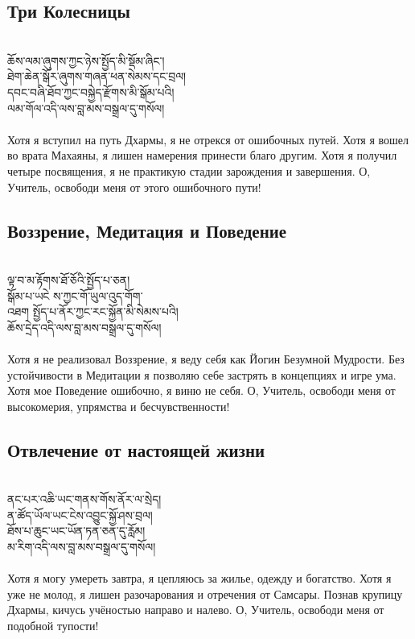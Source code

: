 \subsection*{Три Колесницы}
\\
\ti
ཆོས་ལམ་ཞུགས་ཀྱང་ཉེས་སྤྱོད་མི་སྡོམ་ཞིང་།\\
ཐེག་ཆེན་སྒོར་ཞུགས་གཞན་ཕན་སེམས་དང་བྲལ།\\
དབང་བཞི་ཐོབ་ཀྱང་བསྐྱེད་རྫོགས་མི་སྒོམ་པའི།\\
ལམ་གོལ་འདི་ལས་བླ་མས་བསྒྲལ་དུ་གསོལ།\\
\\
\ru
Хотя я вступил на путь Дхармы, я не отрекся от ошибочных путей.
Хотя я вошел во врата Махаяны, я лишен намерения принести благо другим.
Хотя я получил четыре посвящения, я не практикую стадии зарождения и завершения.
О, Учитель, освободи меня от этого ошибочного пути!

\subsection*{Воззрение, Медитация и Поведение}
\\
\ti
ལྟ་བ་མ་རྟོགས་ཐོ་ཅོའི་སྤྱོད་པ་ཅན།\\
སྒོམ་པ་ཡངེ ས་ཀྱང་གོ་ཡུལ་འུད་གོག་\\
འཐག སྤྱོད་པ་ནོར་ཀྱང་རང་སྐྱོན་མི་སེམས་པའི། \\
ཆོས་དྲེད་འདི་ལས་བླ་མས་བསྒྲལ་དུ་གསོལ།\\
\\
\ru
Хотя я не реализовал Воззрение, я веду себя как Йогин Безумной Мудрости.
Без устойчивости в Медитации я позволяю себе застрять в концепциях и игре ума.
Хотя мое Поведение ошибочно, я виню не себя.
О, Учитель, освободи меня от высокомерия, упрямства и бесчувственности!

\newpage
\subsection*{Отвлечение от настоящей жизни}
\\
\ti
ནང་པར་འཆི་ཡང་གནས་གོས་ནོར་ལ་སྲེད།\\
ན་ཚོད་ཡོལ་ཡང་ངེས་འབྱུང་སྐྱོ་ཤས་བྲལ། \\
ཐོས་པ་ཆུང་ཡང་ཡོན་ཏན་ཅན་དུ་རློམ། \\
མ་རིག་འདི་ལས་བླ་མས་བསྒྲལ་དུ་གསོལ།\\
\\
\ru
Хотя я могу умереть завтра, я цепляюсь за жилье, одежду и богатство.
Хотя я уже не молод, я лишен разочарования и отречения от Самсары.
Познав крупицу Дхармы, кичусь учёностью направо и налево.
О, Учитель, освободи меня от подобной тупости!

